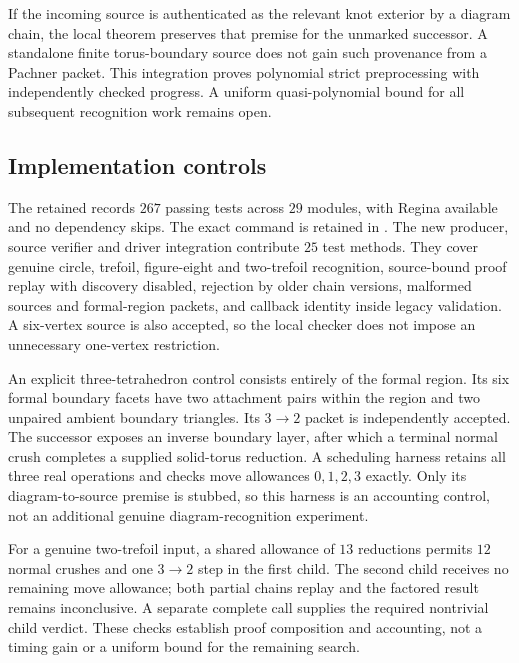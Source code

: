 If the incoming source is authenticated as the relevant knot exterior by
a diagram chain, the local theorem preserves that premise for the unmarked
successor.  A standalone finite torus-boundary source does not gain such
provenance from a Pachner packet.  This integration proves polynomial
strict preprocessing with independently checked progress.  A uniform
quasi-polynomial bound for all subsequent recognition work remains open.

\subsection{Implementation controls}

The retained  records $267$ passing
tests across $29$ modules, with Regina available and no dependency skips.
The exact command is retained in
.  The new producer, source
verifier and driver integration contribute $25$ test methods.  They
cover genuine circle, trefoil, figure-eight and two-trefoil recognition,
source-bound proof replay with discovery disabled, rejection by older
chain versions, malformed sources and formal-region packets, and callback
identity inside legacy validation.  A six-vertex source is also accepted,
so the local checker does not impose an unnecessary one-vertex restriction.

An explicit three-tetrahedron control consists entirely of the formal
region.  Its six formal boundary facets have two attachment pairs within
the region and two unpaired ambient boundary triangles.  Its $3\to2$
packet is independently accepted.  The successor exposes an inverse
boundary layer, after which a terminal normal crush completes a supplied
solid-torus reduction.  A scheduling harness retains all three real
operations and checks move allowances $0,1,2,3$ exactly.  Only its
diagram-to-source premise is stubbed, so this harness is an accounting
control, not an additional genuine diagram-recognition experiment.

For a genuine two-trefoil input, a shared allowance of $13$ reductions
permits $12$ normal crushes and one $3\to2$ step in the first child.
The second child receives no remaining move allowance; both partial
chains replay and the factored result remains inconclusive.  A separate
complete call supplies the required nontrivial child verdict.  These
checks establish proof composition and accounting, not a timing gain
or a uniform bound for the remaining search.

